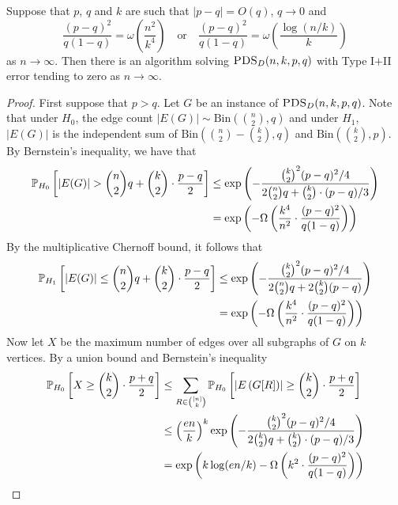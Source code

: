 \begin{theorem} \label{thm:pdsdet}
Suppose that $p$, $q$ and $k$ are such that $|p - q| = O(q)$, $q \to 0$ and
$$\frac{(p - q)^2}{q(1 - q)} = \omega\left( \frac{n^2}{k^4} \right) \quad \text{or} \quad \frac{(p - q)^2}{q(1 - q)} = \omega\left(\frac{\log(n/k)}{k}\right)$$
as $n \to \infty$. Then there is an algorithm solving $\textsc{PDS}_D(n, k, p, q)$ with Type I$+$II error tending to zero as $n \to \infty$.
\end{theorem}

\begin{proof}
First suppose that $p > q$. Let $G$ be an instance of $\textsc{PDS}_D(n, k, p, q)$. Note that under $H_0$, the edge count $|E(G)| \sim \text{Bin}( \binom{n}{2}, q )$ and under $H_1$, $|E(G)|$ is the independent sum of $\text{Bin}( \binom{n}{2} - \binom{k}{2}, q )$ and $\text{Bin}( \binom{k}{2}, p )$. By Bernstein's inequality, we have that
\begin{align*}
\mathbb{P}_{H_0}\left[ |E(G)| > \binom{n}{2} q + \binom{k}{2} \cdot \frac{p - q}{2} \right] &\le \exp\left( - \frac{\binom{k}{2}^2 ( p - q)^2/4}{2\binom{n}{2} q + \binom{k}{2} \cdot (p - q)/3} \right) \\
&= \exp\left( - \Omega\left( \frac{k^4}{n^2} \cdot \frac{(p-q)^2}{q(1 - q)} \right) \right)
\end{align*}
By the multiplicative Chernoff bound, it follows that
\begin{align*}
\mathbb{P}_{H_1}\left[ |E(G)| \le \binom{n}{2} q + \binom{k}{2} \cdot \frac{p - q}{2} \right] &\le \exp\left( - \frac{\binom{k}{2}^2 (p - q)^2/4}{2\binom{n}{2} q + 2 \binom{k}{2} (p - q)}\right) \\
&= \exp\left( - \Omega\left( \frac{k^4}{n^2} \cdot \frac{(p-q)^2}{q(1 - q)} \right) \right)
\end{align*}
Now let $X$ be the maximum number of edges over all subgraphs of $G$ on $k$ vertices. By a union bound and Bernstein's inequality
\begin{align*}
\mathbb{P}_{H_0}\left[ X \ge \binom{k}{2} \cdot \frac{p + q}{2} \right] &\le \sum_{R \in \binom{[n]}{k}} \mathbb{P}_{H_0} \left[ \left|E\left(G[R]\right)\right| \ge \binom{k}{2} \cdot \frac{p + q}{2} \right] \\
&\le \left( \frac{en}{k} \right)^k \exp \left( - \frac{\binom{k}{2}^2 ( p - q)^2/4}{2\binom{k}{2} q + \binom{k}{2} \cdot (p - q)/3} \right) \\
&= \exp\left( k \log (en/k) - \Omega\left( k^2 \cdot \frac{(p-q)^2}{q(1 - q)} \right) \right)
\end{align*}

\end{proof}
